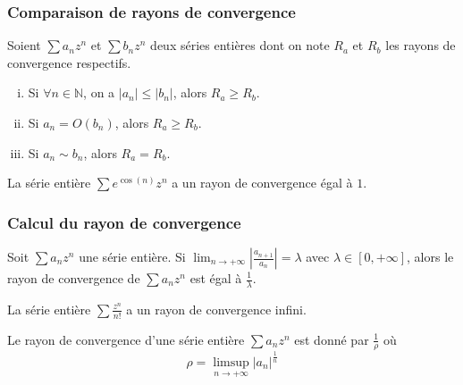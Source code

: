 	\subsubsection{Comparaison de rayons de convergence}
	
	
	Soient $\sum a_n z^n$ et $\sum b_n z^n$ deux séries entières dont on note $R_a$ et $R_b$ les rayons de convergence respectifs.
	
	\begin{proposition}
		\begin{enumerate}[(i)]
			\item Si $\forall n \in \mathbb{N}$, on a $|a_n| \leq |b_n|$, alors $R_a \geq R_b$.
			\item Si $a_n = O(b_n)$, alors $R_a \geq R_b$.
			\item Si $a_n \sim b_n$, alors $R_a = R_b$.
		\end{enumerate}
	\end{proposition}
	
	\begin{example}
		La série entière $\sum e^{\cos(n)} z^n$ a un rayon de convergence égal à $1$.
	\end{example}
	
	\subsubsection{Calcul du rayon de convergence}
	
	
	\begin{proposition}
		Soit $\sum a_n z^n$ une série entière. Si $\lim_{n \rightarrow +\infty} \left| \frac{a_{n+1}}{a_n} \right| = \lambda$ avec $\lambda \in [0, +\infty]$, alors le rayon de convergence de $\sum a_n z^n$ est égal à $\frac{1}{\lambda}$.
	\end{proposition}
	
	\begin{example}
		La série entière $\sum \frac{z^n}{n!}$ a un rayon de convergence infini.
	\end{example}
	
	\begin{proposition}
		Le rayon de convergence d'une série entière $\sum a_n z^n$ est donné par $\frac{1}{\rho}$ où
		\[ \rho = \limsup_{n \rightarrow +\infty} |a_n|^{\frac{1}{n}} \]
	\end{proposition}
	
